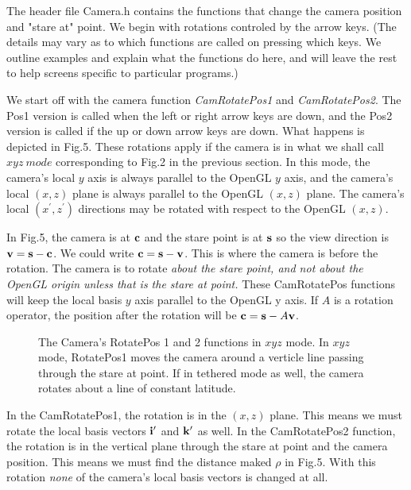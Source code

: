 \documentclass[12pt]{article}
\begin{document}
The header file Camera.h contains the functions that change the
camera position and "stare at" point. We begin with rotations
controled by the arrow keys. (The details may vary as to which functions
are called on pressing which keys. We outline examples and explain
what the functions do here, and will leave the rest to help screens 
specific to particular programs.)

We start off with the camera function {\it CamRotatePos1}
and {\it CamRotatePos2}. The Pos1 version is called when the left or right
arrow keys are down, and the Pos2 version is called if the up or down
arrow keys are down. What happens is depicted in Fig.5. 
These rotations apply if the camera is in what we shall call $xyz \> mode$
corresponding to Fig.2 in the previous section.
In this mode, the camera's local $y$ axis is always parallel to the OpenGL
$y$ axis, and the camera's local $(x,z)$ plane is always parallel to the
OpenGL $(x,z)$ plane. The camera's local $(x^\prime,z^\prime)$ directions
may be rotated with respect to the OpenGL $(x,z)$.

In Fig.5, the camera is at $\bf c$ and the stare point is at $\bf s$
 so the view direction is ${\bf v}={\bf s}-{\bf c}$. We could write
${\bf c}={\bf s}-{\bf v}$. This is where the camera is before the rotation.
The camera is to rotate {\it about the stare point, and not about the OpenGL
origin unless that is the stare at point.}  These CamRotatePos functions
will keep the local basis $y$ axis parallel to the OpenGL y axis. If
$A$ is a rotation operator, the position after the rotation will be 
${\bf c}={\bf s}-A{\bf v}$. 
\begin{figure}[htb]
\vspace*{10cm}
\caption{ 
The Camera's RotatePos 1 and 2 functions in $xyz$ mode. In $xyz$ mode,
RotatePos1 moves the camera around a verticle line passing through
the stare at point. If in tethered mode as well, the camera rotates about
a line of constant latitude.
}
\end{figure}

In the CamRotatePos1, the rotation is in the $(x,z)$ plane. This means we
must rotate the local basis vectors ${\bf i}^\prime$ and ${\bf k}^\prime$
as well. In the CamRotatePos2 function, the rotation is in the vertical
plane through the stare at point and the camera position. This means
we must find the distance maked $\rho$ in Fig.5. With this rotation 
{\it none} of the camera's local basis vectors is changed at all.
\end{document}
